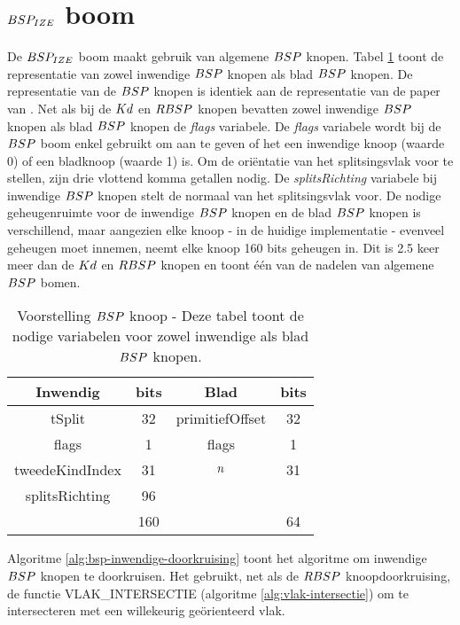 \section{$BSP_{IZE}$ boom}
\label{sec:h4-bspize}
De $BSP_{IZE}$ boom maakt gebruik van algemene $\symBSP$ knopen. 
Tabel \ref{tab:voorstelling-bsp-knoop} toont de representatie van zowel inwendige $\symBSP$ knopen als blad $\symBSP$ knopen.
De representatie van de $\symBSP$ knopen is identiek aan de representatie van de paper van \authorIze{} \cite{ize}.
Net als bij de $Kd$ en $RBSP$ knopen bevatten zowel inwendige $\symBSP$ knopen als blad $\symBSP$ knopen de \textit{flags} variabele.
De \textit{flags} variabele wordt bij de $\symBSP$ boom enkel gebruikt om aan te geven of het een inwendige knoop (waarde 0) of een bladknoop (waarde 1) is.
Om de oriëntatie van het splitsingsvlak voor te stellen, zijn drie vlottend komma getallen nodig.
De \textit{splitsRichting} variabele bij inwendige $\symBSP$ knopen stelt de normaal van het splitsingsvlak voor.
De nodige geheugenruimte voor de inwendige $\symBSP$ knopen en de blad $\symBSP$ knopen is verschillend, maar aangezien elke knoop - in de huidige implementatie - evenveel geheugen moet innemen, neemt elke knoop 160 bits geheugen in.
Dit is 2.5 keer meer dan de $Kd$ en $RBSP$ knopen en toont één van de nadelen van algemene $\symBSP$ bomen.\\
\begin{table}
        \centering
        \begin{tabular}{@{}|c|c|c|c|@{}} \toprule      
            Inwendig & bits & Blad & bits \\ \midrule
            tSplit & 32 & primitiefOffset & 32 \\
            flags  & 1  &  flags   & 1    \\
            tweedeKindIndex & 31 & $n$ & 31 \\
            splitsRichting & 96 &  &  \\ \hline \hline
            & 160 & & 64    \\ \bottomrule
        \end{tabular}
    \caption[Voorstelling $\symBSP$ knoop]{Voorstelling $\symBSP$ knoop - \small Deze tabel toont de nodige variabelen voor zowel inwendige als blad $\symBSP$ knopen.}
    \label{tab:voorstelling-bsp-knoop}
\end{table}   

Algoritme \ref{alg:bsp-inwendige-doorkruising} toont het algoritme om inwendige $\symBSP$ knopen te doorkruisen.
Het gebruikt, net als de $RBSP$ knoopdoorkruising, de functie VLAK\_INTERSECTIE (algoritme \ref{alg:vlak-intersectie}) om te intersecteren met een willekeurig geörienteerd vlak.
  
